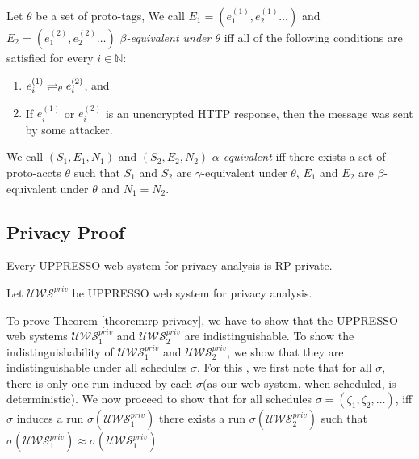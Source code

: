   \begin{definition}\label{def:rp:Events}
    Let $\theta$ be a set of proto-tags, 
    We call $E_1 = (e_1^{(1)}, e_2^{(1)}\dots)$ and
    $E_2= (e_1^{(2)}, e_2^{(2)} \dots)$ 
    \emph{$\beta$-equivalent under $\theta$} 
    iff all of the following conditions are satisfied for every 
    $i \in \mathbb{N}$:
  
    \begin{enumerate}
      \item\label{eqe:rp:distinction} 
        $e_i^{(1)} \rightleftharpoons_{\theta} e_i^{(2)}$, and
      \item\label{eqe:rp:pre:unencrypted-http} 
        If $e_i^{(1)}$ or $e_i^{(2)}$ is an unencrypted HTTP 
        response, then the message was sent by some attacker.
    \end{enumerate}
  \end{definition}
  
  \begin{definition}
    We call $(S_1,E_1,N_1)$ and $(S_2,E_2,N_2)$
    \emph{$\alpha$-equivalent} iff there exists a set of 
    proto-accts $\theta$ such that $S_1$ and $S_2$ are
    $\gamma$-equivalent under $\theta$, $E_1$ and $E_2$ are
    $\beta$-equivalent under $\theta$ and $N_1 = N_2$.
  \end{definition}
  
  \subsection{Privacy Proof}
  
  \begin{theorem} \label{theorem:rp-privacy}
    Every UPPRESSO web system for privacy analysis is RP-private.
  \end{theorem}
  
  Let $\mathcal{U\!W\!S}^{priv}$ be UPPRESSO web system for 
  privacy analysis.
  
  To prove Theorem \ref{theorem:rp-privacy}, we have to show that 
  the UPPRESSO web systems $\mathcal{U\!W\!S}^{priv}_1$ and 
  $\mathcal{U\!W\!S}^{priv}_2$ are indistinguishable. To show 
  the indistinguishability of $\mathcal{U\!W\!S}^{priv}_1$ and 
  $\mathcal{U\!W\!S}^{priv}_2$, we show that they are 
  indistinguishable under all schedules $\sigma$. For this , 
  we first note that for all $\sigma$, there is only one run 
  induced by each $\sigma$(as our web system, when scheduled, is deterministic).
  We now proceed to show that for all schedules $\sigma=(\zeta _1, \zeta_2,\dots)$, 
  iff $\sigma$ induces a run $\sigma(\mathcal{U\!W\!S}^{priv}_1)$ 
  there exists a run $\sigma(\mathcal{U\!W\!S}^{priv}_2)$ 
  such that $\sigma(\mathcal{U\!W\!S}^{priv}_1)\approx\sigma(\mathcal{U\!W\!S}^{priv}_1)$
  

